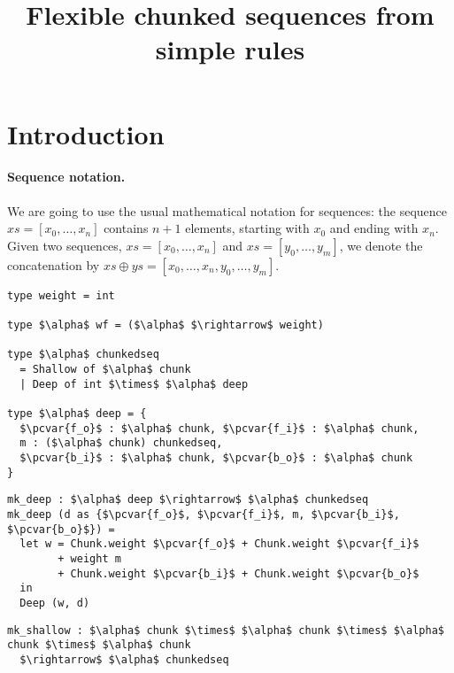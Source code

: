 \documentclass[10pt]{article}
\title{Flexible chunked sequences from simple rules}
\author{}
\newcommand{\pcvar}[1]{\mathtt{#1}}
\begin{document}
\maketitle

\section{Introduction}

\paragraph{Sequence notation.} We are going to use the usual mathematical
notation for sequences: the sequence $xs = [x_0, \ldots, x_n]$
contains $n + 1$ elements, starting with $x_0$ and ending with
$x_n$. Given two sequences, $xs = [x_0, \ldots, x_n]$ and $xs = [y_0,
  \ldots, y_m]$, we denote the concatenation by $xs \oplus ys = [x_0,
  \ldots, x_n, y_0, \ldots, y_m]$.

\begin{lstlisting}[language=pcpp,style=nonumbers]
type weight = int

type $\alpha$ wf = ($\alpha$ $\rightarrow$ weight)

type $\alpha$ chunkedseq
  = Shallow of $\alpha$ chunk
  | Deep of int $\times$ $\alpha$ deep

type $\alpha$ deep = {
  $\pcvar{f_o}$ : $\alpha$ chunk, $\pcvar{f_i}$ : $\alpha$ chunk,
  m : ($\alpha$ chunk) chunkedseq,
  $\pcvar{b_i}$ : $\alpha$ chunk, $\pcvar{b_o}$ : $\alpha$ chunk
}
\end{lstlisting}

\begin{lstlisting}[language=pcpp,style=nonumbers]
mk_deep : $\alpha$ deep $\rightarrow$ $\alpha$ chunkedseq
mk_deep (d as {$\pcvar{f_o}$, $\pcvar{f_i}$, m, $\pcvar{b_i}$, $\pcvar{b_o}$}) =
  let w = Chunk.weight $\pcvar{f_o}$ + Chunk.weight $\pcvar{f_i}$
        + weight m
        + Chunk.weight $\pcvar{b_i}$ + Chunk.weight $\pcvar{b_o}$
  in
  Deep (w, d)
\end{lstlisting}

\begin{lstlisting}[language=pcpp,style=nonumbers]
mk_shallow : $\alpha$ chunk $\times$ $\alpha$ chunk $\times$ $\alpha$ chunk $\times$ $\alpha$ chunk
  $\rightarrow$ $\alpha$ chunkedseq
\end{lstlisting}
\end{document}
